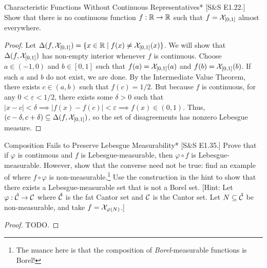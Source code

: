 \begin{problem}{Characteristic Functions Without Continuous Representatives}*
    [S\&S E1.22.] Show that there is no continuous function \(f : \mathbb{R} \to \mathbb{R}\) such that \(f = \mathcal{X}_{[0,1]}\) almost everywhere.
\end{problem}

\begin{proof}
    Let \(\Delta(f, \mathcal{X}_{[0,1]}) = \{x \in \mathbb{R} \mid f(x) \neq \mathcal{X}_{[0,1]}(x)\}\). We will show that \(\Delta(f, \mathcal{X}_{[0,1]})\) has non-empty interior whenever \(f\) is continuous. Choose \(a \in (-1,0)\) and \(b \in [0,1]\) such that \(f(a) = \mathcal{X}_{[0,1]}(a)\) and \(f(b) = \mathcal{X}_{[0,1]}(b)\). If such \(a\) and \(b\) do not exist, we are done. By the Intermediate Value Theorem, there exists \(c \in (a, b)\) such that \(f(c) = 1/2\). But because \(f\) is continuous, for any \(0 < \varepsilon < 1/2\), there exists some \(\delta > 0\) such that \(|x - c| < \delta \implies |f(x) - f(c)| < \varepsilon \implies f(x) \in (0, 1)\). Thus, \((c - \delta, c + \delta) \subseteq \Delta(f, \mathcal{X}_{[0,1]})\), so the set of disagreements has nonzero Lebesgue measure. 
\end{proof}

\begin{problem}{Composition Fails to Preserve Lebesgue Measurability}*
    [S\&S E1.35.] Prove that if \(\varphi\) is continuous and \(f\) is Lebesgue-measurable, then \(\varphi \circ f\) is Lebesgue-measurable. However, show that the converse need not be true: find an example of where \(f \circ \varphi\) is non-measurable.\footnote{The nuance here is that the composition of \emph{Borel}-measurable functions is Borel!} Use the construction in the hint to show that there exists a Lebesgue-measurable set that is not a Borel set. 
    [Hint: Let \(\varphi : \hat{\mathcal{C}} \to \mathcal{C}\) where \(\hat{\mathcal{C}}\) is the fat Cantor set and \(\mathcal{C}\) is the Cantor set. Let \(N \subseteq \hat{\mathcal{C}}\) be non-measurable, and take \(f = \mathcal{X}_{\varphi(N)}\).]
\end{problem}

\begin{proof}
    TODO. 
\end{proof}

